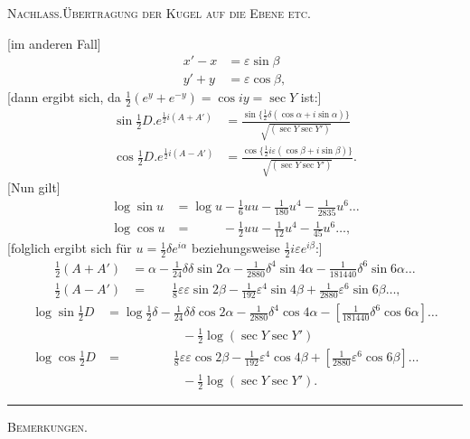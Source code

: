 \begingroup
\clearpage
{}\hfill{\small\textsc{Nachlass.\quad Übertragung der Kugel auf die Ebene etc.}}\hfill\mbox{}\par\medskip
\begingroup\small
[im anderen Fall]
\[
\begin{aligned}
x'-x&=\varepsilon\sin\beta\\
y'+y&=\varepsilon\cos\beta,
\end{aligned}
\]
[dann ergibt sich, da $\tfrac12(e^y+e^{-y})=\cos iy=\sec Y$ ist:]
\[
\begin{aligned}
\sin\tfrac12D.e^{\frac12i(A+A')}&=\frac{\sin\{\frac12\delta(\cos\alpha+i\sin\alpha)\}}{\sqrt{(\sec Y\sec Y')}}\\[5pt]
\cos\tfrac12D.e^{\frac12i(A-A')}&=\frac{\cos\{\frac12i\varepsilon(\cos\beta+i\sin\beta)\}}{\sqrt{(\sec Y\sec Y')}}.
\end{aligned}
\]
[Nun gilt]
\[
\begin{aligned}
\log\sin u&=\log u-\tfrac16uu-\tfrac1{180}u^4-\tfrac1{2835}u^6\ldots\\
\log\cos u&=\phantom{\log u}-\tfrac12uu-\tfrac1{12}u^4-\tfrac1{45}u^6\ldots,
\end{aligned}
\]
[folglich ergibt sich für $u=\tfrac12\delta e^{i\alpha}$ beziehungsweise $\tfrac12i\varepsilon e^{i\beta}$:]
\[
\begin{aligned}
\tfrac12(A+A')&=\alpha-\tfrac1{24}\delta\delta\sin2\alpha-\tfrac1{2880}\delta^4\sin4\alpha-\tfrac1{181440}\delta^6\sin6\alpha\ldots\\
\tfrac12(A-A')&=\phantom{\alpha-}\tfrac18\varepsilon\varepsilon\sin2\beta-\tfrac1{192}\varepsilon^4\sin4\beta+\tfrac1{2880}\varepsilon^6\sin6\beta\ldots,
\end{aligned}
\]
\[
\begin{aligned}
\log\sin\tfrac12D&=\log\tfrac12\delta-\tfrac1{24}\delta\delta\cos2\alpha-\tfrac1{2880}\delta^4\cos4\alpha-[\tfrac1{181440}\delta^6\cos6\alpha]\ldots\\
&\hspace{6em}-\tfrac12\log(\sec Y\sec Y')\\
\log\cos\tfrac12D&=\hspace{4em}\tfrac18\varepsilon\varepsilon\cos2\beta-\tfrac1{192}\varepsilon^4\cos4\beta+[\tfrac1{2880}\varepsilon^6\cos6\beta]\ldots\\
&\hspace{6em}-\tfrac12\log(\sec Y\sec Y').
\end{aligned}
\]
\begin{center}\rule{.18\textwidth}{.4pt}\par\medskip\textsc{Bemerkungen.}\end{center}

